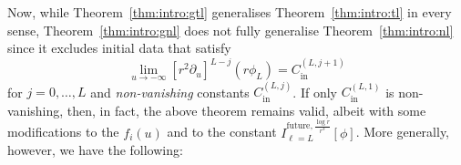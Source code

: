 \documentclass[11pt,english]{article}
\numberwithin{equation}{section}
\theoremstyle{remark}
\theoremstyle{plain}
\theoremstyle{remark}
\newcommand{\pu}{\partial_u}
\renewcommand{\(}{\left(}
\renewcommand{\)}{\right)}
\newcommand{\ILlog}[1]{I_{\ell=#1}^{\mathrm{future},\frac{\log r}{r^3}}}
\begin{document}

Now, while Theorem~\ref{thm:intro:gtl} generalises Theorem~\ref{thm:intro:tl} in every sense, Theorem~\ref{thm:intro:gnl} does not fully generalise Theorem~\ref{thm:intro:nl} since it excludes initial data that satisfy
\begin{equation}
\lim_{u\to-\infty}[r^2\pu]^{L-j}(r\phi_L)=C_{\mathrm{in}}^{(L,j+1)}
\end{equation}
for $j=0,\dots, L$ and \emph{non-vanishing} constants $C_{\mathrm{in}}^{(L,j)}$. If only  $C_{\mathrm{in}}^{(L,1)}$ is non-vanishing, then, in fact, the above theorem remains valid, albeit with some modifications to the $f_i(u)$ and to the constant $\ILlog{L}[\phi]$. 
More generally, however, we have the following:
\end{document}

